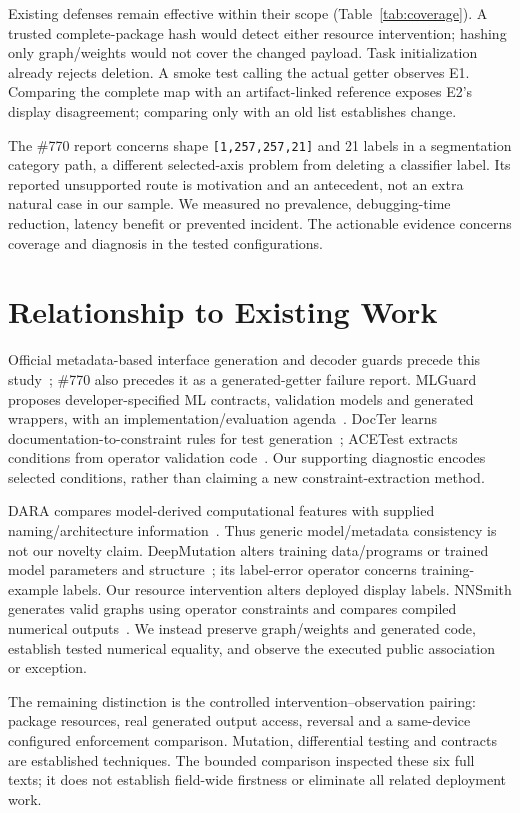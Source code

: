 \documentclass[10pt,conference]{IEEEtran}
\newcommand{\code}[1]{\texttt{#1}}
\begin{document}
Existing defenses remain effective within their scope (Table~\ref{tab:coverage}). A trusted complete-package hash would detect either resource intervention; hashing only graph/weights would not cover the changed payload. Task initialization already rejects deletion. A smoke test calling the actual getter observes E1. Comparing the complete map with an artifact-linked reference exposes E2's display disagreement; comparing only with an old list establishes change.

The \#770 report concerns shape \code{[1,257,257,21]} and 21 labels in a segmentation category path, a different selected-axis problem from deleting a classifier label. Its reported unsupported route is motivation and an antecedent, not an extra natural case in our sample. We measured no prevalence, debugging-time reduction, latency benefit or prevented incident. The actionable evidence concerns coverage and diagnosis in the tested configurations.

\section{Relationship to Existing Work}
\label{sec:related}
Official metadata-based interface generation and decoder guards precede this study~\cite{codegen-doc,tensorlabel}; \#770 also precedes it as a generated-getter failure report. MLGuard proposes developer-specified ML contracts, validation models and generated wrappers, with an implementation/evaluation agenda~\cite{mlguard}. DocTer learns documentation-to-constraint rules for test generation~\cite{docter}; ACETest extracts conditions from operator validation code~\cite{acetest}. Our supporting diagnostic encodes selected conditions, rather than claiming a new constraint-extraction method.

DARA compares model-derived computational features with supplied naming/architecture information~\cite{dara}. Thus generic model/metadata consistency is not our novelty claim. DeepMutation alters training data/programs or trained model parameters and structure~\cite{deepmutation}; its label-error operator concerns training-example labels. Our resource intervention alters deployed display labels. NNSmith generates valid graphs using operator constraints and compares compiled numerical outputs~\cite{nnsmith}. We instead preserve graph/weights and generated code, establish tested numerical equality, and observe the executed public association or exception.

The remaining distinction is the controlled intervention--observation pairing: package resources, real generated output access, reversal and a same-device configured enforcement comparison. Mutation, differential testing and contracts are established techniques. The bounded comparison inspected these six full texts; it does not establish field-wide firstness or eliminate all related deployment work.
\end{document}
